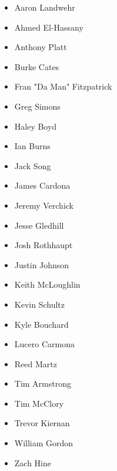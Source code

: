 \documentclass{article}
\begin{document}
\begin{multicols}{2}
\begin{itemize}
\item Aaron Landwehr
\item Ahmed El-Hassany
\item Anthony Platt
\item Burke Cates
\item Fran "Da Man" Fitzpatrick
\item Greg Simons
\item Haley Boyd
\item Ian Burns
\item Jack Song
\item James Cardona
\item Jeremy Verchick
\item Jesse Gledhill
\item Josh Rothhaupt
\item Justin Johnson
\item Keith McLoughlin
\item Kevin Schultz
\item Kyle Bouchard
\item Lucero Carmona
\item Reed Martz
\item Tim Armstrong
\item Tim McClory
\item Trevor Kiernan
\item William Gordon
\item Zach Hine
\end{itemize}
\end{multicols}
\end{document}
